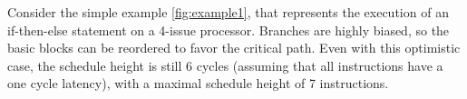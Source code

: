 Consider the simple example \ref{fig:example1}, that represents the execution of an if-then-else statement on a 4-issue processor. Branches are highly biased, so the basic blocks can be reordered to favor the critical path. Even with this optimistic case, the schedule height is still 6 cycles (assuming that all instructions have a one cycle latency), with a maximal schedule height of 7 instructions. 

\begin{figure}
\footnotesize


\end{figure}
